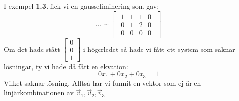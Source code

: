 I exempel \textbf{1.3.} fick vi en gausseliminering som gav:
\[
... \sim
\begin{bmatrix}
	\begin{array}{ccc|c}
		1 & 1 & 1 & 0\\
		0 & 1 & 2 & 0\\
		0 & 0 & 0 & 0
	\end{array}
\end{bmatrix}
\]
Om det hade stått $\begin{bmatrix} 0\\0\\1 \end{bmatrix}$ i högerledet så hade vi fått ett system som saknar lösningar, ty vi hade då fått en ekvation:
\[
0x_1 + 0x_2 + 0x_3 = 1
\]
Vilket saknar lösning. Alltså har vi funnit en vektor som ej är en linjärkombinationen av $\vec{v}_1, \vec{v}_2, \vec{v}_3$\\
